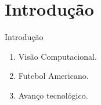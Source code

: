 \section{Introdução}

\begin{frame}{Introdução}

\begin{enumerate}
 \item {Visão Computacional.}
 \item {Futebol Americano.}
 \item {Avanço tecnológico.}
\end{enumerate}

\end{frame}